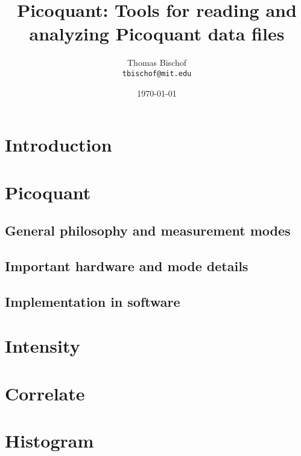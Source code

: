 \documentclass{article}
\title{Picoquant: Tools for reading and analyzing Picoquant data files}
\author{Thomas Bischof \\ \texttt{tbischof@mit.edu}}
\date{\today}
\begin{document}
\maketitle
\tableofcontents
 
\section{Introduction}

\section{Picoquant}
\subsection{General philosophy and measurement modes}

\subsection{Important hardware and mode details}

\subsection{Implementation in software}

\section{Intensity}

\section{Correlate}

\section{Histogram}
\end{document}
